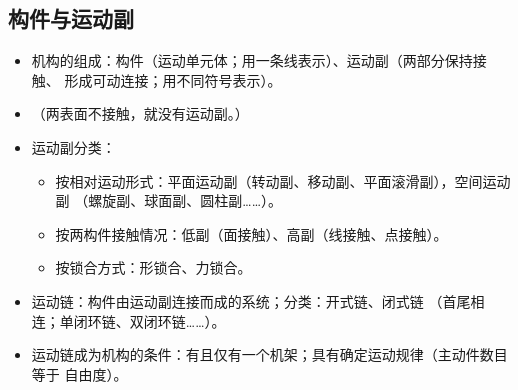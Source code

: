 \documentclass[12pt,a4paper]{article}
\newcommand{\tightlist}{\setlength{\parskip}{0pt}\setlength{\itemsep}{0pt}}
\newcommand{\hint}[1]{\textsf{（#1）}}
\newcommand{\minor}[1]{{\color{gray} #1}}
\begin{document}
\subsection{构件与运动副}
\begin{itemize}\tightlist
    \item 机构的组成：构件\hint{运动单元体；用一条线表示}、运动副\hint{两部分保持接触、
    形成可动连接；用不同符号表示}。
    \item \hint{两表面不接触，就没有运动副。}
    \item 运动副分类：
    \begin{itemize}\tightlist
        \item 按相对运动形式：平面运动副\hint{转动副、移动副、平面滚滑副}，空间运动副
        \minor{\hint{螺旋副、球面副、圆柱副……}}。
        \item 按两构件接触情况：低副\hint{面接触}、高副\hint{线接触、点接触}。
        \item 按锁合方式：形锁合、力锁合。
    \end{itemize}
    \item 运动链：构件由运动副连接而成的系统；分类：开式链、闭式链
    \hint{首尾相连；单闭环链、双闭环链……}。
    \item 运动链成为机构的条件：有且仅有一个机架；具有确定运动规律\hint{主动件数目等于
    自由度}。
\end{itemize}
\end{document}
